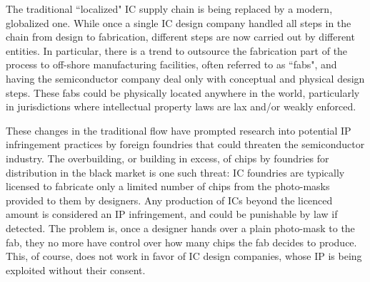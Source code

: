 The traditional ``localized" IC supply chain is being replaced by a modern, globalized one. While once a single IC design company handled all steps in the chain from design to fabrication, different steps are now carried out by different entities. In particular, there is a trend to outsource the fabrication part of the process to off-shore manufacturing facilities, often referred to as ``fabs", and having the semiconductor company deal only with conceptual and physical design steps. These fabs could be physically located anywhere in the world, particularly in jurisdictions where intellectual property laws are lax  and/or weakly enforced.

These changes in the traditional flow have prompted research into potential IP infringement practices by foreign foundries that could threaten the semiconductor industry. The overbuilding, or building in excess, of chips by foundries for distribution in the black market is one such threat: IC foundries are typically licensed to fabricate only a limited number of chips from the photo-masks provided to them by designers. Any production of ICs beyond the licenced amount is considered an IP infringement, and could be punishable by law if detected. The problem is, once a designer hands over a plain photo-mask to the fab, they no more have control over how many chips the fab decides to produce. This, of course, does not work in favor of IC design companies, whose IP is being exploited without their consent. 

